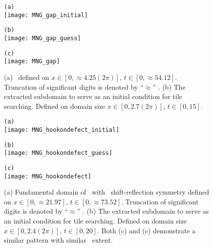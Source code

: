 \begin{description}
\begin{figure}
\begin{minipage}[height=.3\textheight]{.5\textwidth}
\centering
\small{\texttt{(a)}} \\
\texttt{[image: MNG\_gap\_initial]}
\end{minipage}
\begin{minipage}[height=.3\textheight]{.5\textwidth}
\centering
\small{\texttt{(b)}} \\
\texttt{[image: MNG\_gap\_guess]}
\end{minipage}
\begin{minipage}[height=.1\textheight]{\textwidth}
\centering
\small{\texttt{(c)}}\\
\texttt{[image: MNG\_gap]}
\end{minipage}
\caption{ \label{fig:gap}
(a) \twoT\ defined on $x \in [0,\approx 4.25(2\pi)]$, $t \in [0, \approx 54.12]$.  Truncation of significant digits is denoted by ``$\approx$'' .
(b) The extracted subdomain to serve as an
initial condition for tile searching. Defined on domain size $x \in [0,2.7(2\pi)]$, $t \in [0, 15]$.
}
\end{figure}

\begin{figure}
\begin{minipage}[height=.4\textheight]{.5\textwidth}
\centering
\small{\texttt{(a)}} \\
\texttt{[image: MNG\_hookondefect\_initial]}
\end{minipage}
\begin{minipage}[height=.4\textheight]{.5\textwidth}
\centering
\small{\texttt{(b)}} \\
\texttt{[image: MNG\_hookondefect\_guess]}
\end{minipage}
\begin{minipage}[height=.4\textheight]{\textwidth}
\centering
\small{\texttt{(c)}} \\
\texttt{[image: MNG\_hookondefect]}
\end{minipage}
\caption{ \label{fig:hookondefect}
(a) Fundamental domain of \twot\ with \spt\
shift-reflection symmetry defined on $x \in [0,\approx 21.97]$, $t \in [0, \approx 73.52]$.  Truncation of significant digits is denoted by ``$\approx$'' .
(b) The extracted subdomain to serve as an
initial condition for tile searching. Defined on domain size $x \in [0,2.4(2\pi)]$, $t \in [0, 20]$. Both  (c) and (c) demonstrate a similar pattern with similar \spt\ extent.
}
\end{figure}


\end{description}
